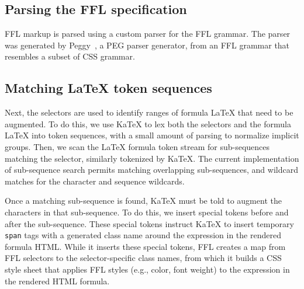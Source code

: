 
\subsection{Parsing the FFL specification}
FFL markup is parsed using a custom parser for the FFL grammar. The parser was generated by Peggy~\cite{Peggy}, a PEG parser generator, from an FFL grammar that resembles a subset of CSS grammar.


\subsection{Matching LaTeX token sequences}
Next, the selectors are used to identify ranges of formula LaTeX that need to be augmented. To do this, we use KaTeX to lex both the selectors and the formula LaTeX into token sequences, with a small amount of parsing to normalize implicit groups. Then, we scan the LaTeX formula token stream for sub-sequences matching the selector, similarly tokenized by KaTeX.  The current implementation of sub-sequence search permits matching overlapping sub-sequences, and wildcard matches for the character and sequence wildcards.

Once a matching sub-sequence is found, KaTeX must be told to augment the characters in that sub-sequence. To do this, we insert special tokens before and after the sub-sequence. These special tokens instruct KaTeX to insert temporary \texttt{span} tags with a generated class name around the expression in the rendered formula HTML. While it inserts these special tokens, FFL creates a map from FFL selectors to the selector-specific class names, from which it builds a CSS style sheet that applies FFL styles (e.g., color, font weight) to the expression in the rendered HTML formula.

